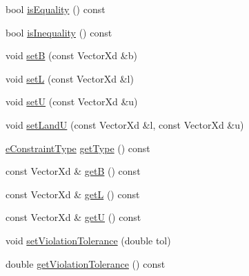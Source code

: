 {\bf }\par
\begin{DoxyCompactItemize}
\item 
bool \hyperlink{classocra_1_1Constraint_3_01Function_01_4_a3c7d085d888ef8937977129740d4c8a6}{is\+Equality} () const
\item 
bool \hyperlink{classocra_1_1Constraint_3_01Function_01_4_ab9083572de0c38297a7c20d88b82e183}{is\+Inequality} () const
\end{DoxyCompactItemize}

{\bf }\par
\begin{DoxyCompactItemize}
\item 
void \hyperlink{classocra_1_1Constraint_3_01Function_01_4_a14893e8b8e01e60f0369ef6c934ca6ab}{setB} (const Vector\+Xd \&b)
\item 
void \hyperlink{classocra_1_1Constraint_3_01Function_01_4_a9bfbc2cff3d9ad7099f8f51228b541c4}{setL} (const Vector\+Xd \&l)
\item 
void \hyperlink{classocra_1_1Constraint_3_01Function_01_4_a80c1536eb85f6913a8d80a36456aa90a}{setU} (const Vector\+Xd \&u)
\item 
void \hyperlink{classocra_1_1Constraint_3_01Function_01_4_adbf50d4faf459c8e6469937b0501b5e2}{set\+LandU} (const Vector\+Xd \&l, const Vector\+Xd \&u)
\end{DoxyCompactItemize}

{\bf }\par
\begin{DoxyCompactItemize}
\item 
\hyperlink{namespaceocra_aedff92662043a7f15dc263363db7939b}{e\+Constraint\+Type} \hyperlink{classocra_1_1Constraint_3_01Function_01_4_a05ee69ff17396c36c12dc6df6c7cc12e}{get\+Type} () const
\item 
const Vector\+Xd \& \hyperlink{classocra_1_1Constraint_3_01Function_01_4_a18ee02ca835269c8b648519be8a663ce}{getB} () const
\item 
const Vector\+Xd \& \hyperlink{classocra_1_1Constraint_3_01Function_01_4_a9539f6914fb118de1352f7558c3cb203}{getL} () const
\item 
const Vector\+Xd \& \hyperlink{classocra_1_1Constraint_3_01Function_01_4_aec8febaea23e49d7166a1aeafbcb3f23}{getU} () const
\end{DoxyCompactItemize}

{\bf }\par
\begin{DoxyCompactItemize}
\item 
void \hyperlink{classocra_1_1Constraint_3_01Function_01_4_ac87f7fc6513adba1044b8f53f3fd2f5d}{set\+Violation\+Tolerance} (double tol)
\item 
double \hyperlink{classocra_1_1Constraint_3_01Function_01_4_a72f3bc312073f4d431547261ff06387e}{get\+Violation\+Tolerance} () const
\end{DoxyCompactItemize}

